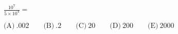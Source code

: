

$\frac{10^7}{5\times 10^4}=$


$\text{(A)}\ .002 \qquad \text{(B)}\ .2 \qquad \text{(C)}\ 20 \qquad \text{(D)}\ 200 \qquad \text{(E)}\ 2000$
